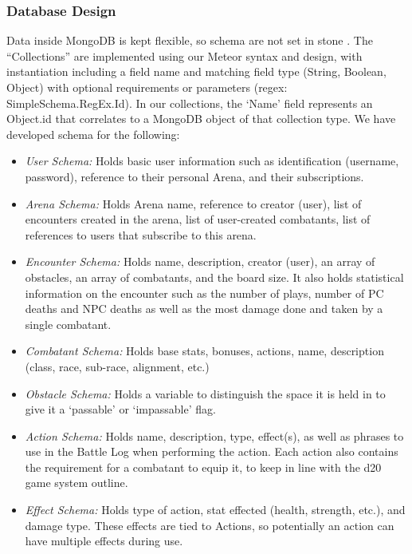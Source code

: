\documentclass[letterpaper, 10 pt, conference]{ieeeconf}
\begin{document}
\subsubsection{Database Design}
Data inside MongoDB is kept flexible, so schema are not set in stone \cite{c2}. The ``Collections'' are implemented using our Meteor syntax and design, with instantiation including a field name and matching field type (String, Boolean, Object) with optional requirements or parameters (regex: SimpleSchema.RegEx.Id). In our collections, the `Name' field represents an Object.id that correlates to a MongoDB object of that collection type. We have developed schema for the following:
\begin{itemize}
	\item \textit{User Schema:} Holds basic user information such as identification (username, password), reference to their personal Arena, and their subscriptions.
	\item \textit{Arena Schema:} Holds Arena name, reference to creator (user), list of encounters created in the arena, list of user-created combatants, list of references to users that subscribe to this arena.
	\item \textit{Encounter Schema:} Holds name, description, creator (user), an array of obstacles, an array of combatants, and the board size. It also holds statistical information on the encounter such as the number of plays, number of PC deaths and NPC deaths as well as the most damage done and taken by a single combatant.
	\item \textit{Combatant Schema: } Holds base stats, bonuses, actions, name, description (class, race, sub-race, alignment, etc.)
	\item \textit{Obstacle Schema:} Holds a variable to distinguish the space it is held in to give it a `passable' or `impassable' flag.
	\item \textit{Action Schema:} Holds name, description, type, effect(s), as well as phrases to use in the Battle Log when performing the action. Each action also contains the requirement for a combatant to equip it, to keep in line with the d20 game system outline.
	\item \textit{Effect Schema: } Holds type of action, stat effected (health, strength, etc.), and damage type. These effects are tied to Actions, so potentially an action can have multiple effects during use.
\end{itemize}
\end{document}
